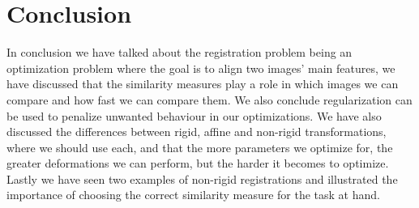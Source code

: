 \section{Conclusion}
In conclusion we have talked about the registration problem being an optimization problem where the goal is to align two images' main features, we have discussed that the similarity measures play a role in which images we can compare and how fast we can compare them. We also conclude regularization can be used to penalize unwanted behaviour in our optimizations. We have also discussed the differences between rigid, affine and non-rigid transformations, where we should use each, and that the more parameters we optimize for, the greater deformations we can perform, but the harder it becomes to optimize. Lastly we have seen two examples of non-rigid registrations and illustrated the importance of choosing the correct similarity measure for the task at hand.
